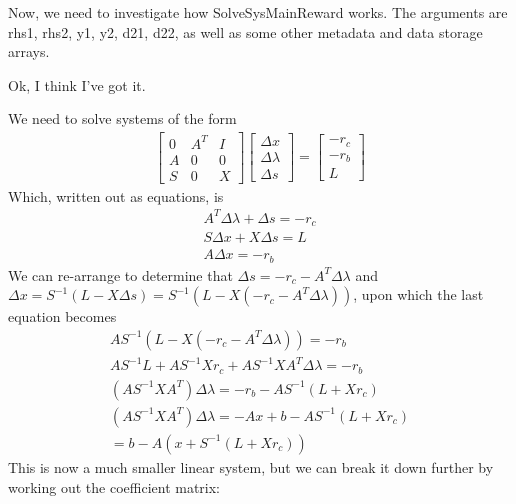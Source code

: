 \documentclass{article}
\begin{document}
Now, we need to investigate how SolveSysMainReward works. The arguments are rhs1, rhs2, y1, y2, d21, d22, as well as some other metadata and data storage arrays. 

Ok, I think I've got it.

We need to solve systems of the form
\begin{align}
		\begin{bmatrix}
				0 & A^T & I\\
				A & 0   & 0\\
				S & 0   & X
		\end{bmatrix}
		\begin{bmatrix}
				\Delta x\\
				\Delta \lambda\\
				\Delta s
		\end{bmatrix} 
		= 
		\begin{bmatrix}
				-r_c\\
				-r_b\\
				L
		\end{bmatrix}
\end{align}
Which, written out as equations, is
\begin{align}
		A^T\Delta \lambda + \Delta s = -r_c\\
		S\Delta x + X\Delta s = L\\
		A\Delta x = -r_b
\end{align}
We can re-arrange to determine that $\Delta s = -r_c - A^T\Delta \lambda$ and $\Delta x = S^{-1}(L - X\Delta s) = S^{-1}(L - X(-r_c - A^T\Delta \lambda))$, upon which the last equation becomes
\begin{align}
		AS^{-1}(L - X(-r_c - A^T\Delta \lambda)) = -r_b\\
		AS^{-1}L + AS^{-1}Xr_c + AS^{-1}XA^T\Delta \lambda = -r_b\\
		(AS^{-1}XA^T) \Delta \lambda = -r_b - AS^{-1}(L + Xr_c)\\
		(AS^{-1}XA^T) \Delta \lambda = -Ax + b - AS^{-1}(L + Xr_c)\\
		= b - A(x + S^{-1}(L + Xr_c))
\end{align}
This is now a much smaller linear system, but we can break it down further by working out the coefficient matrix:
\end{document}
